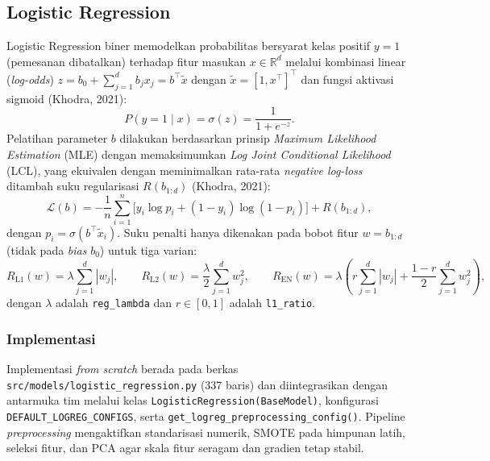 \subsection{Logistic Regression}

Logistic Regression biner memodelkan probabilitas bersyarat kelas positif
$y = 1$ (pemesanan dibatalkan) terhadap fitur masukan $x \in \mathbb{R}^d$
melalui kombinasi linear (\textit{log-odds}) $z = b_0 + \sum_{j=1}^d b_j x_j = b^\top \tilde{x}$
dengan $\tilde{x} = [1, x^\top]^\top$ dan fungsi aktivasi sigmoid (Khodra, 2021):
\[
  P(y = 1 \mid x) = \sigma(z) = \frac{1}{1 + e^{-z}}.
\]
Pelatihan parameter $b$ dilakukan berdasarkan prinsip \textit{Maximum Likelihood
Estimation} (MLE) dengan memaksimumkan \textit{Log Joint Conditional Likelihood}
(LCL), yang ekuivalen dengan meminimalkan rata-rata \textit{negative log-loss}
ditambah suku regularisasi $R(b_{1:d})$ (Khodra, 2021):
\[
  \mathcal{L}(b) = -\frac{1}{n}\sum_{i=1}^{n} \Big[y_i \log p_i + (1 - y_i)\log(1 - p_i)\Big] + R(b_{1:d}),
\]
dengan $p_i = \sigma(b^\top \tilde{x}_i)$. Suku penalti hanya dikenakan pada bobot
fitur $w = b_{1:d}$ (tidak pada \textit{bias} $b_0$) untuk tiga varian:
\[
  R_{\text{L1}}(w) = \lambda \sum_{j=1}^{d} |w_j|, \qquad
  R_{\text{L2}}(w) = \frac{\lambda}{2} \sum_{j=1}^{d} w_j^2, \qquad
  R_{\text{EN}}(w) = \lambda \left( r \sum_{j=1}^{d} |w_j| + \frac{1 - r}{2} \sum_{j=1}^{d} w_j^2 \right),
\]
dengan $\lambda$ adalah \texttt{reg\_lambda} dan $r \in [0, 1]$ adalah
\texttt{l1\_ratio}.

\subsubsection{Implementasi}

Implementasi \textit{from scratch} berada pada berkas
\texttt{src/models/logistic\_regression.py} (337 baris) dan diintegrasikan
dengan antarmuka tim melalui kelas \texttt{LogisticRegression(BaseModel)},
konfigurasi \texttt{DEFAULT\_LOGREG\_CONFIGS}, serta
\texttt{get\_logreg\_preprocessing\_config()}. Pipeline \textit{preprocessing}
mengaktifkan standarisasi numerik, SMOTE pada himpunan latih, seleksi fitur, dan
PCA agar skala fitur seragam dan gradien tetap stabil.

